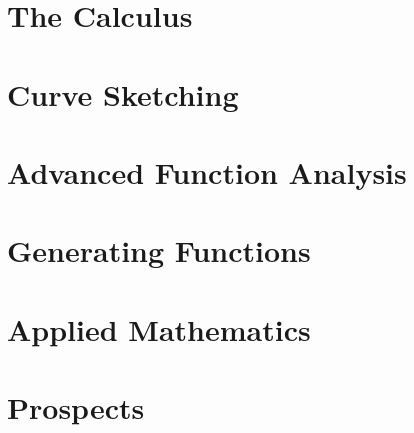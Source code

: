 \documentclass{scrbook}
\begin{document}
\chapter{The Calculus} %

\chapter{Curve Sketching} %
\chapter{Advanced Function Analysis} %
\chapter{Generating Functions} %
\chapter{Applied Mathematics} %
\chapter{Prospects} %
\end{document}
